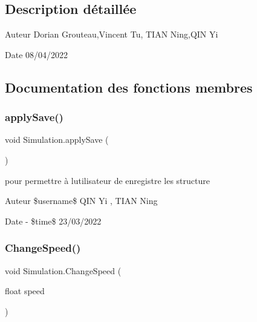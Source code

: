 \subsection{Description détaillée}


\begin{DoxyAuthor}{Auteur}
Dorian Grouteau,Vincent Tu, T\+I\+AN Ning,Q\+IN Yi 
\end{DoxyAuthor}
\begin{DoxyDate}{Date}
08/04/2022
\end{DoxyDate}


\subsection{Documentation des fonctions membres}
\mbox{\label{class_simulation_aee60f7c0cce0789d82fe7a324f1fbffd}} 
\subsubsection{\texorpdfstring{apply\+Save()}{applySave()}}
{\footnotesize\ttfamily void Simulation.\+apply\+Save (\begin{DoxyParamCaption}{ }\end{DoxyParamCaption})\hspace{0.3cm}{\ttfamily [inline]}}



pour permettre à l\textquotesingle{}utilisateur de enregistre les structure 

\begin{DoxyAuthor}{Auteur}
\$username\$ Q\+IN Yi , T\+I\+AN Ning 
\end{DoxyAuthor}
\begin{DoxyDate}{Date}
-\/ \$time\$ 23/03/2022 
\end{DoxyDate}
\mbox{\label{class_simulation_a3fde1a020def21f5f41794735b76c686}} 
\subsubsection{\texorpdfstring{Change\+Speed()}{ChangeSpeed()}}
{\footnotesize\ttfamily void Simulation.\+Change\+Speed (\begin{DoxyParamCaption}\item[{float}]{speed }\end{DoxyParamCaption})\hspace{0.3cm}{\ttfamily [inline]}}



